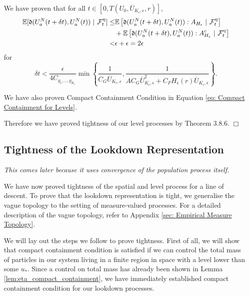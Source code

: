 \documentclass[12pt]{article}
\newenvironment {proof}{{\noindent\bf Proof }}{\hfill $\Box$ \medskip}
\newcommand{\comment}[1]{{\color{blue} \it #1}}
\begin{document}
\begin{proof}
We have proven that for all $t \in [0, T(U_0,\overline{U}_{K_{\epsilon},\epsilon},r)]$,
\begin{equation}
\begin{aligned}
\mathbb{E}[\mathfrak{d}(U^{N}_{a}(t+\delta t),U^{N}_{a}(t))~|~{\cal F}_t^{
\eta}] \leq & \mathbb{E}\left[\mathfrak{d}(U^{N}_{a}(t+\delta t),U^{N}_{a}(t)) : A_{H_{\epsilon}} ~|~{\cal F}_t^{
\eta}\right]\\
&+ \mathbb{E}\left[\mathfrak{d}(U^{N}_{a}(t+\delta t),U^{N}_{a}(t)) : A_{H_{\epsilon}}^{c} ~|~{\cal F}_t^{
\eta}\right] \\
< & \epsilon + \epsilon = 2\epsilon
\end{aligned}    
\end{equation}
for  
\begin{equation*}
\delta t < \frac{\epsilon  }{4C_{g_1,..,g_{K_{\epsilon}}}}\min\left\{\frac{1}{C_G \overline{U}_{K_{\epsilon}, \epsilon}}, \frac{1}{A C_G \overline{U}_{K_{\epsilon}, \epsilon}^2
        +
        C_F H_{\epsilon}(r) \overline{U}_{K_{\epsilon}, \epsilon}}\right\}.    
\end{equation*}

We have also proven Compact Containment Condition in Equation \eqref{eq: Compact Containment for Levels}.

Therefore we have proved tightness of our level processes by \cite{EK} Theorem 3.8.6.
\end{proof}

\subsection{Tightness of the Lookdown Representation}

\comment{
    This comes later because it uses convergence of the population process itself.
}

We have now proved tightness of the spatial and level process for a line of descent. To prove that the lookdown representation is tight, we generalise the vague topology to the setting of measure-valued processes. For a detailed description of the vague topology, refer to Appendix \ref{sec: Empirical Measure Topology}.

We will lay out the steps we follow to prove tightness. First of all, we will show that compact containment condition is satisfied if we can control the total mass of particles in our system living in a finite region in space with a level lower than some $u_{*}$. Since a control on total mass has already been shown in Lemma \ref{lem:eta_compact_containment}, we have immediately established compact containment condition for our lookdown processes. 
\end{document}
